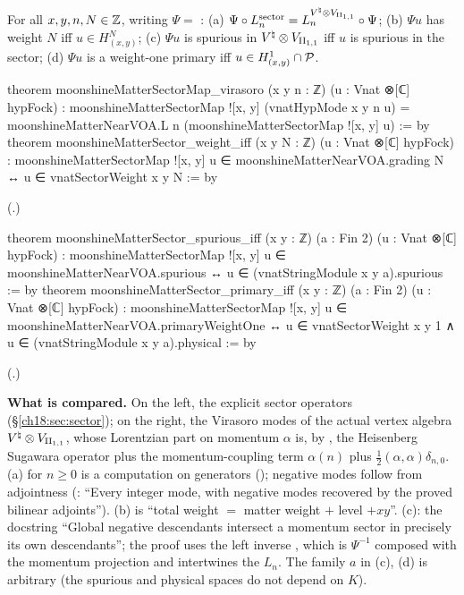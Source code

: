 \begin{theorem}\label{ch18:thm:sectorcomparison}
For all $x,y,n,N\in{\mathbb{Z}}$, writing $\Psi=$ :
(a) $\Psi\circ L_n^{\text{sector}}=L_n^{{V^{\natural}}\otimes V_{\mathrm{II}_{1,1}}}\circ\Psi$;
(b) $\Psi u$ has weight $N$ iff $u\in H^N_{(x,y)}$;
(c) $\Psi u$ is spurious in ${V^{\natural}}\otimes V_{\mathrm{II}_{1,1}}$ iff $u$ is spurious in the sector;
(d) $\Psi u$ is a weight-one primary iff $u\in H^1_{(x,y)}\cap\mathcal{P}$.
\end{theorem}
\begin{leancode}
theorem moonshineMatterSectorMap_virasoro (x y n : ℤ) (u : Vnat ⊗[ℂ] hypFock) :
    moonshineMatterSectorMap ![x, y] (vnatHypMode x y n u) =
      moonshineMatterNearVOA.L n (moonshineMatterSectorMap ![x, y] u) := by
theorem moonshineMatterSector_weight_iff (x y N : ℤ) (u : Vnat ⊗[ℂ] hypFock) :
    moonshineMatterSectorMap ![x, y] u ∈ moonshineMatterNearVOA.grading N ↔
      u ∈ vnatSectorWeight x y N := by
\end{leancode}
(.)
\begin{leancode}
theorem moonshineMatterSector_spurious_iff (x y : ℤ) (a : Fin 2)
    (u : Vnat ⊗[ℂ] hypFock) :
    moonshineMatterSectorMap ![x, y] u ∈ moonshineMatterNearVOA.spurious ↔
      u ∈ (vnatStringModule x y a).spurious := by
theorem moonshineMatterSector_primary_iff (x y : ℤ) (a : Fin 2)
    (u : Vnat ⊗[ℂ] hypFock) :
    moonshineMatterSectorMap ![x, y] u ∈ moonshineMatterNearVOA.primaryWeightOne ↔
      u ∈ vnatSectorWeight x y 1 ∧ u ∈ (vnatStringModule x y a).physical := by
\end{leancode}
(.)
\begin{dictionary}
\textbf{What is compared.}  On the left, the explicit sector operators (\S\ref{ch18:sec:sector}); on the
right, the Virasoro modes of the actual vertex algebra ${V^{\natural}}\otimes V_{\mathrm{II}_{1,1}}$, whose Lorentzian part on
momentum $\alpha$ is, by , the Heisenberg Sugawara operator plus the
momentum-coupling term $\alpha(n)$ plus $\frac12(\alpha,\alpha)\delta_{n,0}$.  (a) for $n\ge0$ is a computation on generators
(); negative modes follow from adjointness
(: ``Every integer mode, with negative modes recovered by the proved
bilinear adjoints'').  (b) is ``total weight $=$ matter weight $+$ level $+xy$''.  (c): the docstring
``Global negative descendants intersect a momentum sector in precisely its own descendants''; the proof uses
the left inverse , which is $\Psi^{-1}$ composed with the momentum projection
and intertwines the $L_n$.  The family $a$ in (c), (d) is arbitrary (the spurious and physical spaces do
not depend on $K$).
\end{dictionary}
